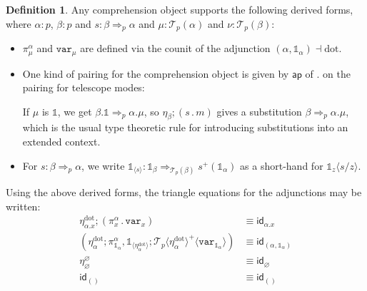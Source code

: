 \documentclass[10pt]{article}
\theoremstyle{definition}
\newtheorem{definition}{Definition}
\let\emptyset\varnothing
\newcommand\dsd[1]{\ensuremath{\mathsf{#1}}}
\newcommand{\tcell}{\Rightarrow}
\newcommand{\app}[2]{\ensuremath{#1 \: #2}}
\newcommand{\fst}[1]{\app{\dsd{fst}}{#1}}
\newcommand{\snd}[1]{\app{\dsd{snd}}{#1}}
\newcommand{\id}{\mathsf{id}}
\newcommand\TermTwoT[5]{\ensuremath{#1 \vdash {#2} : #3 \tcell_{#5} #4}}
\newcommand\TrPlus[2]{\ensuremath{{#1}^+(#2)}}
\newcommand\El[2]{\mathcal{T}_{#1}(#2)}
\newcommand\ApEl[2]{\mathcal{T}_{#1}\langle#2\rangle}
\newcommand\bdot[0]{\mathbin{.}}
\newcommand\ap[2]{\ensuremath{#1 \langle #2 \rangle }}
\newcommand\ApPlus[2]{\ensuremath{{#1}^+ \langle #2 \rangle }}
\newcommand{\sdot}{\ensuremath{\mathrm{dot}}}
\newcommand\One{\ensuremath{\mathds{1}}}
\newcommand\var[1]{\ensuremath{\mathtt{var}_{#1}}}
\newcommand\ApOne[1]{\ensuremath{\One_{\langle {#1} \rangle }}}
\begin{document}
\begin{definition}
Any comprehension object supports the following derived forms, where
$\alpha : p$, $\beta : p$ and
${s} : {\beta} \tcell_p {\alpha}$ and
$\mu : \El{p}{\alpha}$ and $\nu : \El{p}{\beta}$:
  \begin{itemize}
  \item $\pi^\alpha_\mu$ and $\var{\mu}$ are defined via the counit of the adjunction $(\alpha,\One_\alpha) \dashv \sdot$.

  \item One kind of pairing for the comprehension object is given by $\mathsf{ap}$ of
  $.$ on the pairing for telescope modes:

  If $\mu$ is $\One$, we get ${\beta.\One} \tcell_p
  {\alpha.\mu}$, so $\eta_\beta;(s \bdot m)$ gives
  a substitution ${\beta} \tcell_p {\alpha.\mu}$, which is the usual
  type theoretic rule for introducing substitutions into an extended
  context.

  \item For $s : \beta \tcell_p \alpha$, we write $\ApOne{s} :
    \One_{\beta} \tcell_{\El p \beta} \TrPlus{s}{\One_\alpha}$ as a
    short-hand for $\ap{\One_z}{s/z}$.  
  \end{itemize}
\end{definition}

Using the above derived forms, the triangle equations for the adjunctions may be written:
\begin{align}
\label{eq:chi-triangle-1} \eta^\sdot_{\alpha.x};(\pi_x^\alpha \bdot \var{x}) &\equiv \id_{\alpha.x} \\
\label{eq:chi-triangle-2} (\eta^\sdot_\alpha ; \pi^\alpha_{\One_\alpha}, \ApOne{\eta^\sdot_\alpha} ; \ApPlus{\ApEl{p}{\eta^\sdot_\alpha}}{\var{\One_\alpha}}) &\equiv \id_{(\alpha, \One_\alpha)}\\
\eta^\emptyset_\emptyset &\equiv \id_\emptyset \\
\id_{()}&\equiv \id_{()}
\end{align}
\end{document}

